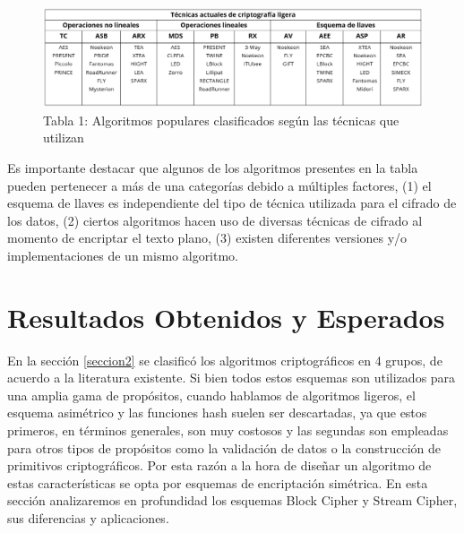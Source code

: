 \documentclass[a4paper,10pt]{article}
\begin{document}
	\begin{figure}[h]
		\centering
		\includegraphics[width=1.0\textwidth]{tablaAlgoritmosCriptografiaLigera.PNG}
		\caption{Tabla 1: Algoritmos populares clasificados según las técnicas que utilizan}
		\label{algoritmosCriptografiaLigera}
	\end{figure}
	Es importante destacar que algunos de los algoritmos presentes en la tabla pueden pertenecer a más de una categorías debido a múltiples factores, (1) el esquema de llaves es independiente del tipo de técnica utilizada para el cifrado de los datos, (2) ciertos algoritmos hacen uso de diversas técnicas de cifrado al momento de encriptar el texto plano, (3) existen diferentes versiones y/o implementaciones de un mismo algoritmo.
	\section{Resultados Obtenidos y Esperados}
	\label{seccion3}
	En la sección \ref{seccion2} se clasificó los algoritmos criptográficos en 4 grupos, de acuerdo a la literatura existente. Si bien todos estos esquemas son utilizados para una amplia gama de propósitos, cuando hablamos de algoritmos ligeros, el esquema asimétrico y las funciones hash suelen ser descartadas, ya que estos primeros, en términos generales, son muy costosos y las segundas son empleadas para otros tipos de propósitos como la validación de datos o la construcción de primitivos criptográficos. Por esta razón a la hora de diseñar un algoritmo de estas características se opta por esquemas de encriptación simétrica. En esta sección analizaremos en profundidad los esquemas Block Cipher y Stream Cipher, sus diferencias y aplicaciones.
\end{document}
